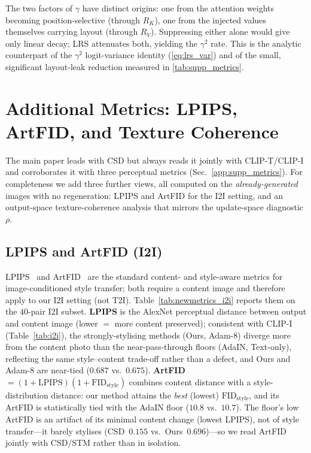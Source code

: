 The two factors of $\gamma$ have distinct origins: one from the attention weights
becoming position-selective (through $R_K$), one from the injected values
themselves carrying layout (through $R_V$). Suppressing either alone would give
only linear decay; LRS attenuates both, yielding the $\gamma^2$ rate. This is the
analytic counterpart of the $\gamma^2$ logit-variance identity
(\cref{eq:lrs_var}) and of the small, significant layout-leak reduction measured
in \cref{tab:supp_metrics}.

\section{Additional Metrics: LPIPS, ArtFID, and Texture Coherence}
\label{app:newmetrics}

The main paper leads with CSD but always reads it jointly with CLIP-T/CLIP-I and
corroborates it with three perceptual metrics (Sec.~\ref{app:supp_metrics}). For
completeness we add three further views, all computed on the
\emph{already-generated} images with no regeneration: LPIPS and ArtFID for the
I2I setting, and an output-space texture-coherence analysis that mirrors the
update-space diagnostic $\rho$.

\subsection{LPIPS and ArtFID (I2I)}
LPIPS~\cite{zhang2018unreasonable} and ArtFID~\cite{wright2022artfid} are the
standard content- and style-aware metrics for image-conditioned style transfer;
both require a content image and therefore apply to our I2I setting (not T2I).
Table~\ref{tab:newmetrics_i2i} reports them on the $40$-pair I2I subset.
\textbf{LPIPS} is the AlexNet perceptual distance between output and content
image (lower $=$ more content preserved); consistent with CLIP-I
(Table~\ref{tab:i2i}), the strongly-stylising methods (Ours, Adam-8) diverge more
from the content photo than the near-pass-through floors (AdaIN, Text-only),
reflecting the same style--content trade-off rather than a defect, and Ours and
Adam-8 are near-tied ($0.687$ vs.\ $0.675$).
\textbf{ArtFID}~$=(1+\mathrm{LPIPS})(1+\mathrm{FID}_{\text{style}})$ combines
content distance with a style-distribution distance: our method attains the
\emph{best} (lowest) $\mathrm{FID}_{\text{style}}$, and its ArtFID is
statistically tied with the AdaIN floor ($10.8$ vs.\ $10.7$). The floor's low
ArtFID is an artifact of its minimal content change (lowest LPIPS), not of style
transfer---it barely stylises (CSD~$0.155$ vs.\ Ours~$0.696$)---so we read
ArtFID jointly with CSD/STM rather than in isolation.

